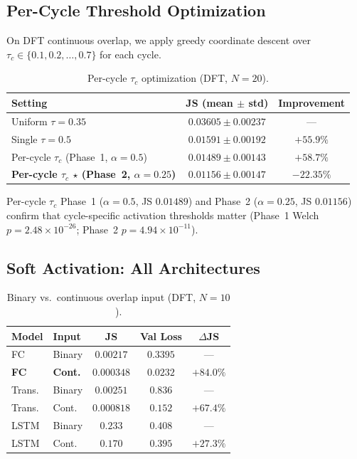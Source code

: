 \documentclass[conference,10pt,a4paper]{IEEEtran}
\begin{document}
\subsection{Per-Cycle Threshold Optimization}
\label{subsec:percycle}

On DFT continuous overlap, we apply greedy coordinate descent over
$\tau_c \in \{0.1, 0.2, \ldots, 0.7\}$ for each cycle.

\begin{table}[t]
\centering
\caption{Per-cycle $\tau_c$ optimization (DFT, $N=20$).}
\label{tab:percycle}
\begin{tabular}{lcc}
\toprule
Setting & JS (mean $\pm$ std) & Improvement \\
\midrule
Uniform $\tau = 0.35$ & $0.03605 \pm 0.00237$ & --- \\
Single $\tau = 0.5$   & $0.01591 \pm 0.00192$ & $+55.9\%$ \\
Per-cycle $\tau_c$ (Phase~1, $\alpha=0.5$) & $0.01489 \pm 0.00143$ & $+58.7\%$ \\
\textbf{Per-cycle $\tau_c$ $\star$ (Phase~2, $\alpha=0.25$)} & $\mathbf{0.01156 \pm 0.00147}$ & $\mathbf{-22.35\%}$ \\
\bottomrule\end{tabular}
\end{table}

Per-cycle $\tau_c$ Phase~1 ($\alpha=0.5$, JS $0.01489$) and Phase~2 ($\alpha=0.25$, JS $\mathbf{0.01156}$)
confirm that cycle-specific activation thresholds matter
(Phase~1 Welch $p = 2.48\times10^{-26}$; Phase~2 $p = 4.94\times10^{-11}$).

\subsection{Soft Activation: All Architectures}
\label{subsec:soft}

\begin{table}[t]
\centering
\caption{Binary vs.\ continuous overlap input (DFT, $N=10$).}
\label{tab:soft}
\begin{tabular}{llccc}
\toprule
Model & Input & JS & Val Loss & $\Delta$JS \\
\midrule
FC   & Binary & $0.00217$ & $0.3395$ & --- \\
\textbf{FC} & \textbf{Cont.} & $\mathbf{0.000348}$ & $\mathbf{0.0232}$ & $\mathbf{+84.0\%}$ \\
Trans. & Binary & $0.00251$ & $0.836$ & --- \\
Trans. & Cont. & $0.000818$ & $0.152$ & $+67.4\%$ \\
LSTM & Binary & $0.233$ & $0.408$ & --- \\
LSTM & Cont. & $0.170$ & $0.395$ & $+27.3\%$ \\
\bottomrule
\end{tabular}
\end{table}
\end{document}
